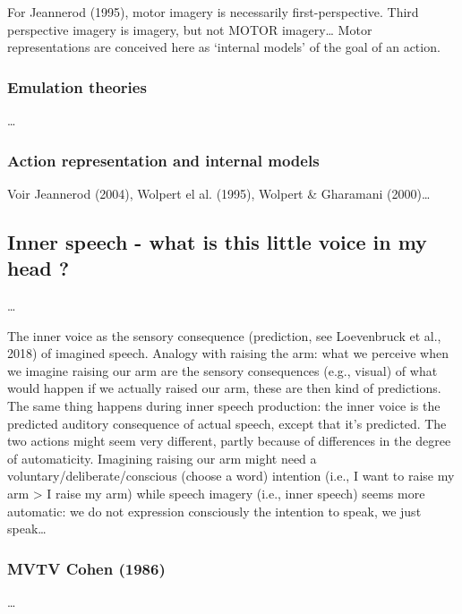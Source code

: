 \documentclass[a4paper,12pt,twoside,openright,oldfontcommands]{memoir}
\begin{document}
For Jeannerod (1995), motor imagery is necessarily first-perspective.
Third perspective imagery is imagery, but not MOTOR imagery\ldots{}
Motor representations are conceived here as `internal models' of the
goal of an action.

\subsubsection{Emulation theories}\label{emulation-theories}

\ldots{}

\subsubsection{Action representation and internal
models}\label{action-representation-and-internal-models}

Voir Jeannerod (2004), Wolpert el al. (1995), Wolpert \& Gharamani
(2000)\ldots{}

\subsection{Inner speech - what is this little voice in my head
?}\label{inner-speech---what-is-this-little-voice-in-my-head}

\ldots{}

The inner voice as the sensory consequence (prediction, see Loevenbruck
et al., 2018) of imagined speech. Analogy with raising the arm: what we
perceive when we imagine raising our arm are the sensory consequences
(e.g., visual) of what would happen if we actually raised our arm, these
are then kind of predictions. The same thing happens during inner speech
production: the inner voice is the predicted auditory consequence of
actual speech, except that it's predicted. The two actions might seem
very different, partly because of differences in the degree of
automaticity. Imagining raising our arm might need a
voluntary/deliberate/conscious (choose a word) intention (i.e., I want
to raise my arm \textgreater{} I raise my arm) while speech imagery
(i.e., inner speech) seems more automatic: we do not expression
consciously the intention to speak, we just speak\ldots{}

\subsubsection{MVTV Cohen (1986)}\label{mvtv-cohen-1986}

\ldots{}
\end{document}
